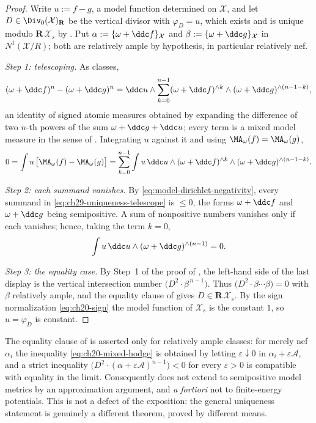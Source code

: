 \begin{proof}
Write \(u:=f-g\), a model function determined on \(\mathcal X\), and let
\(D\in\Div_0(\mathcal X)_{\mathbf R}\) be the vertical divisor with
\(\varphi_D=u\), which exists and is unique modulo
\(\mathbf R\,\mathcal X_s\) by .  Put
\(\alpha:=\{\omega+\ddc f\}_{\mathcal X}\) and
\(\beta:=\{\omega+\ddc g\}_{\mathcal X}\) in \(N^1(\mathcal X/R)\); both are
relatively ample by hypothesis, in particular relatively nef.

\emph{Step 1: telescoping.}  As classes,
\[
 (\omega+\ddc f)^n-(\omega+\ddc g)^n
 =\ddc u\wedge\sum_{k=0}^{n-1}
   (\omega+\ddc f)^{\wedge k}\wedge(\omega+\ddc g)^{\wedge(n-1-k)} ,
\]
an identity of signed atomic measures obtained by expanding the difference
of two \(n\)-th powers of the sum \(\omega+\ddc g+\ddc u\); every term is a
mixed model measure in the sense of .
Integrating \(u\) against it and using
\(\MA_\omega(f)=\MA_\omega(g)\),
\begin{equation}
\label{eq:ch29-uniqueness-telescope}
 0=\int u\,\bigl[\MA_\omega(f)-\MA_\omega(g)\bigr]
  =\sum_{k=0}^{n-1}
    \int u\,\ddc u\wedge(\omega+\ddc f)^{\wedge k}
      \wedge(\omega+\ddc g)^{\wedge(n-1-k)} .
\end{equation}

\emph{Step 2: each summand vanishes.}  By
\eqref{eq:model-dirichlet-negativity}, every summand in
\eqref{eq:ch29-uniqueness-telescope} is \(\leq0\), the forms
\(\omega+\ddc f\) and \(\omega+\ddc g\) being semipositive.  A sum of
nonpositive numbers vanishes only if each vanishes; hence, taking the term
\(k=0\),
\[
 \int u\,\ddc u\wedge(\omega+\ddc g)^{\wedge(n-1)}=0 .
\]

\emph{Step 3: the equality case.}  By Step~1 of the proof of
, the left-hand side of the last
display is the vertical intersection number
\(\bigl(D^2\cdot\beta^{\,n-1}\bigr)\).  Thus
\(\bigl(D^2\cdot\beta\cdots\beta\bigr)=0\) with \(\beta\) relatively ample,
and the equality clause of  gives
\(D\in\mathbf R\,\mathcal X_s\).  By the sign normalization
\eqref{eq:ch20-sign} the model function of \(\mathcal X_s\) is the constant
\(1\), so \(u=\varphi_D\) is constant.
\end{proof}

\begin{remark}
\label{rem:ch29-ample-not-approximable}
The equality clause of  is asserted only for
relatively ample classes: for merely nef \(\alpha_i\) the inequality
\eqref{eq:ch20-mixed-hodge} is obtained by letting
\(\varepsilon\downarrow0\) in
\(\alpha_i+\varepsilon\mathcal A\), and a strict inequality
\(\bigl(D^2\cdot(\alpha+\varepsilon\mathcal A)^{n-1}\bigr)<0\) for every
\(\varepsilon>0\) is compatible with equality in the limit.  Consequently
 does not extend to semipositive model
metrics by an approximation argument, and \emph{a fortiori} not to
finite-energy potentials.  This is not a defect of the exposition: the
general uniqueness statement is genuinely a different theorem, proved by
different means.
\end{remark}

